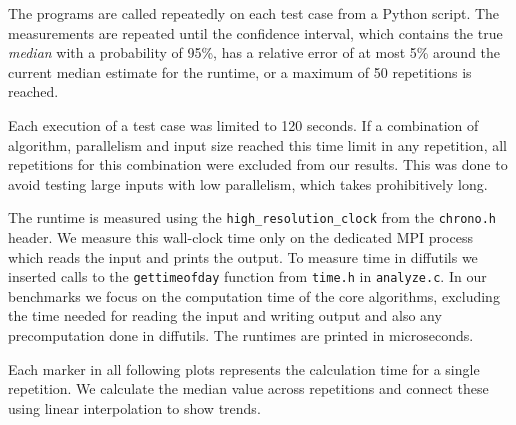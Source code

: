 
The programs are called repeatedly on each test case from a Python script. The measurements are repeated until the confidence interval, which contains the true \emph{median} with a probability of 95\%, has a relative error of at most 5\% around the current median estimate for the runtime, or a maximum of 50 repetitions is reached.

Each execution of a test case was limited to 120 seconds. If a combination of algorithm, parallelism and input size reached this time limit in any repetition, all repetitions for this combination were excluded from our results. This was done to avoid testing large inputs with low parallelism, which takes prohibitively long.

The runtime is measured using the \texttt{high\_\linebreak[0]resolution\linebreak[0]\_clock} from the \texttt{chrono.h} header. We measure this wall-clock time only on the dedicated MPI process which reads the input and prints the output. To measure time in diffutils we inserted calls to the \texttt{gettimeofday} function from \texttt{time.h} in \texttt{analyze.c}. In our benchmarks we focus on the computation time of the core algorithms, excluding the time needed for reading the input and writing output and also any precomputation done in diffutils. The runtimes are printed in microseconds.

Each marker in all following plots represents the calculation time for a single repetition. We calculate the median value across repetitions and connect these using linear interpolation to show trends.

